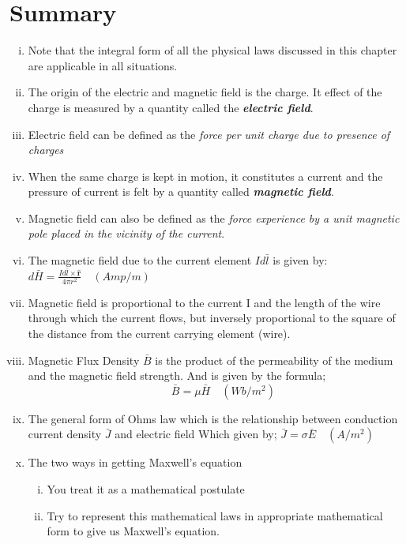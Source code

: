 \section{Summary}
\begin{enumerate}[(i)]
\item Note that the integral form of all the physical laws discussed in this chapter are applicable in all situations.

\item The origin of the electric and magnetic field is the charge. It effect of the charge is measured by a quantity called the \textbf{\emph{electric field}}.

\item Electric field can be defined as the \emph{force per unit charge due to presence of charges} 

\item When the same charge is kept in motion, it constitutes a current and the pressure of current is felt by a quantity called \textbf{\emph{magnetic field}}.

\item Magnetic field can also be defined as the \emph{force experience by a unit magnetic pole placed in the vicinity of the current}.

\item The magnetic field due to the current element $Id\bar{l}$ is given by:
$\boxed{d\bar{H}= \frac{Id\bar{l} \times \hat{\textbf{r}}}{4\pi r^{2}}}\quad (Amp/m)$ 

\item Magnetic field is proportional to the current I and the length of the wire through which the current flows, but inversely proportional to the square of the distance from the current carrying element (wire).

\item Magnetic Flux Density $\bar{B}$ is the product of the permeability of the medium and the magnetic field strength. And is given by the formula;
$$\quad\boxed{\bar{B} = \mu\bar{H}}\quad (Wb/m^{2})$$

\item The general form of Ohms law which is the relationship between conduction current density $\bar{J}$ and electric field Which given by; $\boxed{\bar{J} = \sigma\bar{E}}\quad (A/m^{2})$

\item The two ways in getting Maxwell's equation 
\begin{enumerate}[(i)]
\item	You treat it as a mathematical postulate
\item	Try to represent this mathematical laws in appropriate mathematical form to give us Maxwell's equation.
\end{enumerate}


\end{enumerate}
